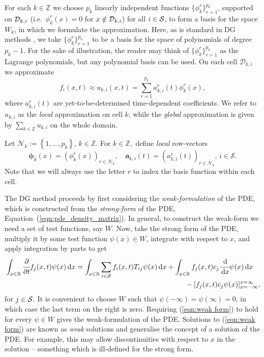 For each \(k\in \mathbb Z\) we choose \(p_k\) linearly independent functions \(\{\phi^r_k\}_{r=1}^{p_k}\), supported on \(\mathcal{D}_{k,i}\) (i.e.~\(\phi^r_k(x)=0\) for \(x\notin\mathcal{D}_{k,i}\)) for all \(i\in\mathcal{S}\), to form a basis for the space \(W_k\), in which we formulate the approximation. Here, as is standard in DG methods \citep{nodalDGBook}, we take \(\{\phi^r_k\}_{r=1}^{p_k}\) to be a basis for the space of polynomials of degree \(p_k-1\). For the sake of illustration, the reader may think of \(\{\phi^r_k\}_{r=1}^{p_k}\) as the Lagrange polynomials, but any polynomial basis can be used. On each cell \(\mathcal D_{k,i}\) we approximate 
\[f_i(x,t)\approx u_{k,i}(x,t)=\sum\limits_{r=1}^{p_k}a_{k,i}^r(t)\phi^r_k(x),\] 
where \(a_{k,i}^r(t)\) are yet-to-be-determined time-dependent coefficients. We refer to \(u_{k,i}\) as the \textit{local} approximation on cell \(k\), while the \textit{global} approximation is given by \(\sum\limits_{k\in\mathbb Z}u_{k,i}\) on the whole domain. %

Let \(\mathcal N_k := \left\{1,\dots,p_k\right\},\, k \in \mathbb Z\). For \(k\in\mathbb Z,\) define \textit{local} row-vectors 
\[\boldsymbol \phi_k(x) = (\phi^r_k(x))_{r\in\mathcal N_k}, \quad \boldsymbol a_{k,i}(t) = (a_{k,i}^r(t))_{r\in\mathcal N_k},\,i\in\mathcal S.\]
Note that we will always use the letter \(r\) to index the basis function within each cell.

The DG method proceeds by first considering the \textit{weak-formulation} of the PDE, which is constructed from the \textit{strong-form} of the PDE, Equation~(\ref{eqn:pde_density_matrix}). In general, to construct the weak-form we need a set of test functions, say \(W\). Now, take the strong form of the PDE, multiply it by some test function \(\psi(x)\in W\), integrate with respect to \(x\), and apply integration by parts to get 
\begin{align}
\begin{multlined}[t]
	\int_{x\in\mathbb R}\cfrac{\partial}{\partial t} f_j(x,t)\psi(x)\wrt x = \int_{x\in\mathbb R} \sum_{i\in\calS}f_i(x,t)T_{ij}\psi(x)\wrt x 
	+  \int_{x\in\mathbb R} f_j(x,t)c_j\cfrac{\wrt}{\wrt x}\psi(x)\wrt x \\{}- [ f_j(x,t)c_j\psi(x)]_{x=-\infty}^{x=\infty}, \end{multlined}\label{eqn:weak form}
\end{align}
for \(j\in\mathcal{S}\). It is convenient to choose \(W\) such that \(\psi(-\infty)=\psi(\infty)=0\), in which case the last term on the right is zero. Requiring (\ref{eqn:weak form}) to hold for every \(\psi\in W\) gives the weak-formulation of the PDE. Solutions to (\ref{eqn:weak form}) are known as \textit{weak} solutions and generalise the concept of a solution of the PDE. For example, this may allow discontinuities with respect to \(x\) in the solution -- something which is ill-defined for the strong form.

